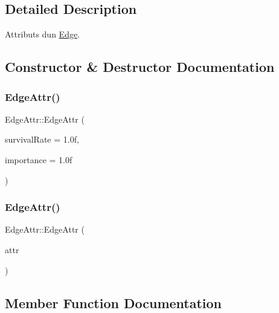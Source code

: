 \subsection{Detailed Description}
Attributs d\textquotesingle{}un \mbox{\hyperlink{class_edge}{Edge}}. 

\subsection{Constructor \& Destructor Documentation}
\mbox{\label{struct_edge_attr_a6f055eafff1a137f3fe97e49508c65f5}} 
\subsubsection{\texorpdfstring{Edge\+Attr()}{EdgeAttr()}\hspace{0.1cm}{\footnotesize\ttfamily [1/2]}}
{\footnotesize\ttfamily Edge\+Attr\+::\+Edge\+Attr (\begin{DoxyParamCaption}\item[{float}]{survival\+Rate = {\ttfamily 1.0f},  }\item[{float}]{importance = {\ttfamily 1.0f} }\end{DoxyParamCaption})\hspace{0.3cm}{\ttfamily [inline]}}

\mbox{\label{struct_edge_attr_a0252b91de5679426054a8cd478ebfd1e}} 
\subsubsection{\texorpdfstring{Edge\+Attr()}{EdgeAttr()}\hspace{0.1cm}{\footnotesize\ttfamily [2/2]}}
{\footnotesize\ttfamily Edge\+Attr\+::\+Edge\+Attr (\begin{DoxyParamCaption}\item[{const \mbox{\hyperlink{struct_edge_attr}{Edge\+Attr}} \&}]{attr }\end{DoxyParamCaption})\hspace{0.3cm}{\ttfamily [inline]}}



\subsection{Member Function Documentation}
\mbox{\label{struct_edge_attr_a337958a03dbbc39c139ee507d73555be}} 
